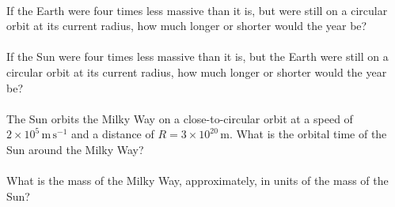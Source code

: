 \documentclass[12pt]{article}
\newcommand{\m}{\mathrm{m}}
\newcommand{\s}{\mathrm{s}}
\newcommand{\mps}{\m\,\s^{-1}}
\newcounter{problem}
\begin{document}
\paragraph{\theproblem}%
If the Earth were four times less massive than it is, but were still on
a circular orbit at its current radius, how much longer or shorter
would the year be?

\paragraph{\theproblem}%
If the Sun were four times less massive than it is, but the Earth were
still on a circular orbit at its current radius, how much longer or
shorter would the year be?

\paragraph{\theproblem}%
The Sun orbits the Milky Way on a close-to-circular orbit at a speed
of $2\times 10^5\,\mps$ and a distance of $R= 3\times 10^{20}\,\m$.
What is the orbital time of the Sun around the Milky Way?

\paragraph{\theproblem}%
What is the mass of the Milky Way, approximately, in units of the mass
of the Sun?
\end{document}
